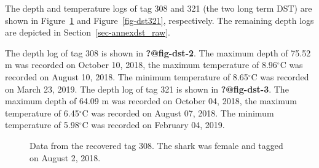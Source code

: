 \documentclass[
  authoryear,
  review,
  3p]{elsarticle}
\begin{document}
The depth and temperature logs of tag 308 and 321 (the two long term
DST) are shown in Figure~\ref{fig-dst308} and Figure~\ref{fig-dst321},
respectively. The remaining depth logs are depicted in
Section~\ref{sec-annexdst_raw}.

The depth log of tag 308 is shown in \textbf{?@fig-dst-2}. The maximum
depth of 75.52 m was recorded on October 10, 2018, the maximum
temperature of 8.96\(^\circ\)C was recorded on August 10, 2018. The
minimum temperature of 8.65\(^\circ\)C was recorded on March 23, 2019.
The depth log of tag 321 is shown in \textbf{?@fig-dst-3}. The maximum
depth of 64.09 m was recorded on October 04, 2018, the maximum
temperature of 6.45\(^\circ\)C was recorded on August 07, 2018. The
minimum temperature of 5.98\(^\circ\)C was recorded on February 04,
2019.

\begin{figure}

\begin{minipage}[t]{\linewidth}

{\centering 


}

\end{minipage}%
\newline
\begin{minipage}[t]{\linewidth}

{\centering 


}

\end{minipage}%

\caption{\label{fig-dst308}Data from the recovered tag 308. The shark
was female and tagged on August 2, 2018.}

\end{figure}
\end{document}
